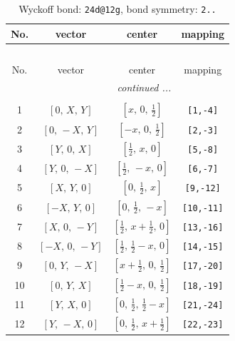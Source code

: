 \documentclass[fleqn,8pt]{jsarticle}
\begin{document}
\begin{longtable}{cccc}
\caption{Wyckoff bond: {\tt 24d@12g}, bond symmetry: {\tt 2..}}
 \\
 \hline \hline
No. & vector & center & mapping \\ \hline \endfirsthead

\multicolumn{3}{l}{\tablename\ \thetable{}} \\
 \hline \hline
No. & vector & center & mapping \\ \hline \endhead

 \hline \hline
\multicolumn{3}{r}{\footnotesize\it continued ...} \\ \endfoot

 \hline \hline
\multicolumn{3}{r}{} \\ \endlastfoot

1 & $\left[ 0,\, X,\, Y \right]$ & $\left[ x,\, 0,\, \frac{1}{2} \right]$ & {\tt [1,-4]} \\ \hline
2 & $\left[ 0,\, - X,\, Y \right]$ & $\left[ - x,\, 0,\, \frac{1}{2} \right]$ & {\tt [2,-3]} \\ \hline
3 & $\left[ Y,\, 0,\, X \right]$ & $\left[ \frac{1}{2},\, x,\, 0 \right]$ & {\tt [5,-8]} \\ \hline
4 & $\left[ Y,\, 0,\, - X \right]$ & $\left[ \frac{1}{2},\, - x,\, 0 \right]$ & {\tt [6,-7]} \\ \hline
5 & $\left[ X,\, Y,\, 0 \right]$ & $\left[ 0,\, \frac{1}{2},\, x \right]$ & {\tt [9,-12]} \\ \hline
6 & $\left[ - X,\, Y,\, 0 \right]$ & $\left[ 0,\, \frac{1}{2},\, - x \right]$ & {\tt [10,-11]} \\ \hline
7 & $\left[ X,\, 0,\, - Y \right]$ & $\left[ \frac{1}{2},\, x + \frac{1}{2},\, 0 \right]$ & {\tt [13,-16]} \\ \hline
8 & $\left[ - X,\, 0,\, - Y \right]$ & $\left[ \frac{1}{2},\, \frac{1}{2} - x,\, 0 \right]$ & {\tt [14,-15]} \\ \hline
9 & $\left[ 0,\, Y,\, - X \right]$ & $\left[ x + \frac{1}{2},\, 0,\, \frac{1}{2} \right]$ & {\tt [17,-20]} \\ \hline
10 & $\left[ 0,\, Y,\, X \right]$ & $\left[ \frac{1}{2} - x,\, 0,\, \frac{1}{2} \right]$ & {\tt [18,-19]} \\ \hline
11 & $\left[ Y,\, X,\, 0 \right]$ & $\left[ 0,\, \frac{1}{2},\, \frac{1}{2} - x \right]$ & {\tt [21,-24]} \\ \hline
12 & $\left[ Y,\, - X,\, 0 \right]$ & $\left[ 0,\, \frac{1}{2},\, x + \frac{1}{2} \right]$ & {\tt [22,-23]} \\ \hline

\end{longtable}
\end{document}
